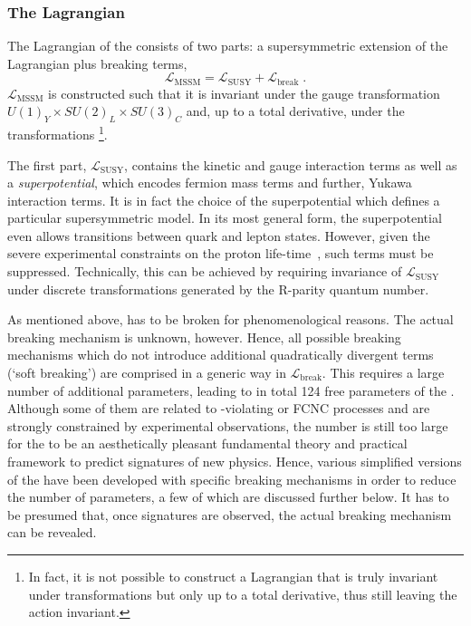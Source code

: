 \subsubsection{The Lagrangian}
The Lagrangian of the \mssm consists of two parts: a supersymmetric extension of the \sm Lagrangian plus \susy breaking terms,
\begin{equation*}
  \mathcal{L}_{\text{MSSM}} = \mathcal{L}_{\text{SUSY}} + \mathcal{L}_{\text{break}} \;.
\end{equation*}
$\mathcal{L}_{\text{MSSM}}$ is constructed such that it is invariant under the \sm gauge transformation \mbox{$U(1)_{Y}\times SU(2)_{L}\times SU(3)_{C}$} and, up to a total derivative, under the \susy transformations \footnote{In fact, it is not possible to construct a Lagrangian that is truly invariant under \susy transformations but only up to a total derivative, thus still leaving the action invariant.}.

The first part, $\mathcal{L}_{\text{SUSY}}$, contains the kinetic and gauge interaction terms as well as a \emph{superpotential}, which encodes fermion mass terms and further, Yukawa interaction terms.
It is in fact the choice of the superpotential which defines a particular supersymmetric model.
In its most general form, the superpotential even allows transitions between quark and lepton states.
However, given the severe experimental constraints \eg on the proton life-time~\cite{PhysRevLett.102.141801}, such terms must be suppressed.
Technically, this can be achieved by requiring invariance of $\mathcal{L}_{\text{SUSY}}$ under discrete transformations generated by the R-parity quantum number.

As mentioned above, \susy has to be broken for phenomenological reasons.
The actual breaking mechanism is unknown, however.
Hence, all possible breaking mechanisms which do not introduce additional quadratically divergent terms (`soft breaking') are comprised in a generic way in $\mathcal{L}_{\text{break}}$.
This requires a large number of additional parameters, leading to in total 124 free parameters of the \mssm.
Although some of them are related to \cp-violating or FCNC processes and are strongly constrained by experimental observations, the number is still too large for the \mssm to be an aesthetically pleasant fundamental theory and practical framework to predict signatures of new physics.
Hence, various simplified versions of the \mssm have been developed with specific breaking mechanisms in order to reduce the number of parameters, a few of which are discussed further below.
It has to be presumed that, once \susy signatures are observed, the actual breaking mechanism can be revealed.


